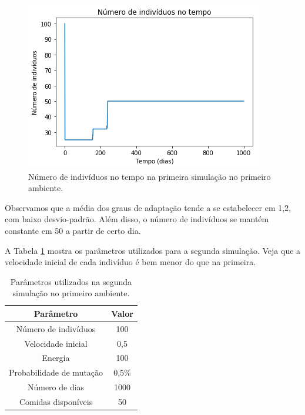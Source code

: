\documentclass[10pt,brazil,english]{article}
\begin{document}
            \begin{figure}[!hbtp]
                \begin{center}
                    \includegraphics[scale=0.5]{Images/1-3.png}
                \end{center}
                \caption{Número de indivíduos no tempo na primeira simulação no primeiro ambiente.}
                \label{Fig3}
            \end{figure}
            
            Observamos que a média dos graus de adaptação tende a se estabelecer em 1,2, com baixo desvio-padrão. Além disso, o número de indivíduos se mantém constante em 50 a partir de certo dia.
            
            A Tabela \ref{Tab2} mostra os parâmetros utilizados para a segunda simulação. Veja que a velocidade inicial de cada indivíduo é bem menor do que na primeira.
            
            \begin{table}[!hbtp]
                \centering
                \caption{Parâmetros utilizados na segunda simulação no primeiro ambiente.}
                \label{Tab2}
                \begin{tabular}{c|c}
                    \hline
                    \textbf{Parâmetro}          & \textbf{Valor}    \\ \hline
                    Número de indivíduos        & 100               \\ \hline
                    Velocidade inicial          & 0,5               \\ \hline
                    Energia                     & 100               \\ \hline
                    Probabilidade de mutação    & 0,5\%             \\ \hline
                    Número de dias              & 1000              \\ \hline
                    Comidas disponíveis         & 50                \\ \hline
                \end{tabular}
            \end{table}
            
\end{document}
